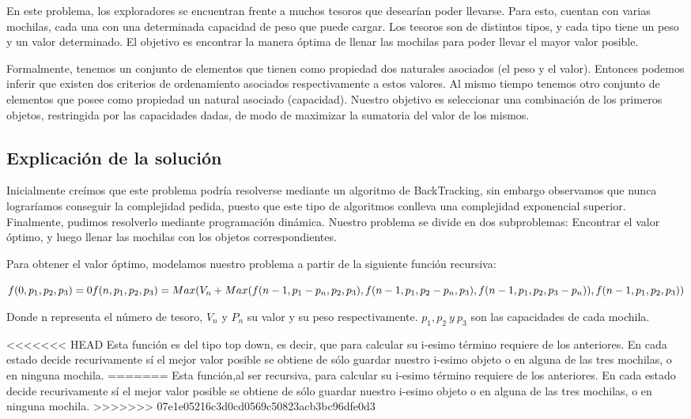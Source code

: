 \documentclass[spanish,12pt]{article}
\begin{document}
{En este problema, los exploradores se encuentran frente a muchos tesoros que desearían poder llevarse. Para esto, cuentan con varias mochilas, cada una con una determinada capacidad de peso que puede cargar.
Los tesoros son de distintos tipos, y cada tipo tiene un peso y un valor determinado.
El objetivo es encontrar la manera óptima de llenar las mochilas para poder llevar el mayor valor posible.

Formalmente, tenemos un conjunto de elementos que tienen como propiedad dos naturales asociados (el peso y el valor). Entonces podemos inferir que existen dos criterios de ordenamiento asociados respectivamente a estos valores.
Al mismo tiempo tenemos otro conjunto de elementos que posee como propiedad un natural asociado (capacidad).
Nuestro objetivo es seleccionar una combinación de los primeros objetos, restringida por las capacidades dadas, de modo de maximizar la sumatoria del valor de los mismos.


\subsection{Explicación de la solución}

   Inicialmente creímos que este problema podría resolverse mediante un algoritmo de BackTracking, sin embargo observamos que nunca lograríamos conseguir la complejidad pedida, puesto que este tipo de algoritmos conlleva una complejidad exponencial superior.
   Finalmente, pudimos resolverlo mediante programación dinámica. Nuestro problema se divide en dos subproblemas:
   Encontrar el valor óptimo, y luego llenar las mochilas con los objetos correspondientes.

   Para obtener el valor óptimo, modelamos nuestro problema a partir de la siguiente función recursiva:

	$f(0,p_{1},p_{2},p_{3})=0 \\
	f(n,p_{1},p_{2},p_{3}) = Max(V_{n}+Max(f(n-1,p_{1}-p_{n},p_{2},p_{3}), f(n-1,p_{1},p_{2}-p_{n},p_{3}), f(n-1,p_{1},p_{2},p_{3}-p_{n})),f(n-1,p_{1},p_{2},p_{3})) $

	Donde n representa el número de tesoro, $V_{n}$ y $P_{n}$ su valor y su peso respectivamente. $p_{1},p_{2}\ y \ p_{3}$ son las capacidades de cada mochila.

<<<<<<< HEAD
	Esta función es del tipo top down, es decir, que para calcular su i-esimo término requiere de los anteriores. En cada estado decide recurivamente sí el mejor valor posible se obtiene de sólo guardar nuestro i-esimo objeto o en alguna de las tres mochilas, o en ninguna mochila.
=======
	Esta función,al ser recursiva, para calcular su i-esimo término requiere de los anteriores. En cada estado decide recurivamente sí el mejor valor posible se obtiene de sólo guardar nuestro i-esimo objeto o en alguna de las tres mochilas, o en ninguna mochila.  
>>>>>>> 07e1e05216c3d0cd0569c50823acb3bc96dfe0d3



}
\end{document}
